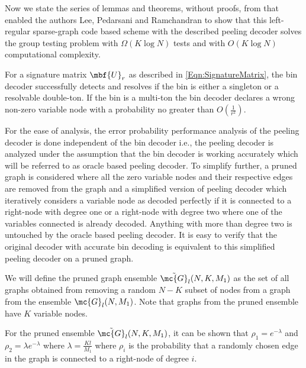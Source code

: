 \documentclass[conference,twocolumn]{IEEEtran}
\begin{document}
Now we state the series of lemmas and theorems, without proofs, from \cite{lee2015saffron} that enabled the authors Lee, Pedarsani and Ramchandran to show that this left-regular sparse-graph code based scheme with the described peeling decoder solves the group testing problem with $\Omega( K\log N)$ tests and with $O(K\log N)$ computational complexity.

\begin{lemma}
For a signature matrix $\mbf{U}_r$ as described in \eqref{Eqn:SignatureMatrix}, the bin decoder successfully detects and resolves if the bin is either a singleton or a resolvable double-ton. If the bin is a multi-ton the bin decoder declares a wrong non-zero variable node with a probability no greater than $O(\frac{1}{r^2})$.
\end{lemma}

For the ease of analysis, the error probability performance analysis of the peeling decoder is done independent of the bin decoder i.e., the peeling decoder is analyzed under the assumption that the bin decoder is working accurately which will be referred to as oracle based peeling decoder. To simplify further, a pruned graph is considered where all the zero variable nodes and their respective edges are removed from the graph and a simplified version of peeling decoder which iteratively considers a variable node as decoded perfectly if it is connected to a right-node with degree one or a right-node with degree two where one of the variables connected is already decoded. Anything with more than degree two is untouched by the oracle based peeling decoder. It is easy to verify that the original decoder with accurate bin decoding is equivalent to this simplified peeling decoder on a pruned graph.

\begin{definition}
We will define the pruned graph ensemble $\tilde{\mc{G}}_l(N,K,M_1)$ as the set of all graphs obtained from removing a random $N-K$ subset of nodes from a graph from the ensemble $\mc{G}_l(N,M_1)$. Note that graphs from the pruned ensemble have $K$ variable nodes. 
\end{definition}

\begin{lemma}
For the pruned ensemble $\tilde{\mc{G}}_l(N,K,M_1)$, it can be shown that $\rho_{1}=e^{-\lambda}$ and $\rho_{2}=\lambda e^{-\lambda}$ where $\lambda=\frac{Kl}{M_1}$ where $\rho_i$ is the probability that a randomly chosen edge in the graph is connected to a right-node of degree $i$.
\end{lemma}
\end{document}
